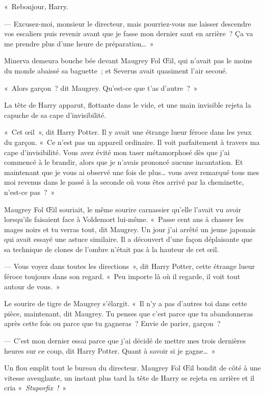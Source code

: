 \later

«~Rebonjour, Harry.

--- Excusez-moi, monsieur le directeur, mais pourriez-vous me laisser descendre vos escaliers puis revenir avant que je fasse mon dernier saut en arrière~? Ça va me prendre plus d'une heure de préparation…~»

\later

Minerva demeura bouche bée devant Maugrey Fol Œil, qui n'avait pas le moins du monde abaissé sa baguette~; et Severus avait quasiment l'air secoué.

«~Alors garçon~? dit Maugrey. Qu'est-ce que t'as d'autre~?~»

La tête de Harry apparut, flottante dans le vide, et une main invisible rejeta la capuche de sa cape d'invisibilité.

«~Cet œil~», dit Harry Potter. Il y avait une étrange lueur féroce dans les yeux du garçon. «~Ce n'est pas un appareil ordinaire. Il voit parfaitement à travers ma cape d'invisibilité. Vous avez évité mon taser métamorphosé dès que j'ai commencé à le brandir, alors que je n'avais prononcé aucune incantation. Et maintenant que je vous ai observé une fois de plus… vous avez remarqué tous mes moi revenus dans le passé à la seconde où vous êtes arrivé par la cheminette, n'est-ce pas~?~»

Maugrey Fol Œil souriait, le même sourire carnassier qu'elle l'avait vu avoir lorsqu'ils faisaient face à Voldemort lui-même. «~Passe cent ans à chasser les mages noirs et tu verras tout, dit Maugrey. Un jour j'ai arrêté un jeune japonais qui avait essayé une astuce similaire. Il a découvert d'une façon déplaisante que sa technique de clones de l'ombre n'était pas à la hauteur de cet œil.

--- Vous voyez dans toutes les directions~», dit Harry Potter, cette étrange lueur féroce toujours dans son regard. «~Peu importe là où il regarde, il voit tout autour de vous.~»

Le sourire de tigre de Maugrey s'élargit. «~Il n'y a pas d'autres toi dans cette pièce, maintenant, dit Maugrey. Tu penses que c'est parce que tu abandonneras après cette fois ou parce que tu gagneras~? Envie de parier, garçon~?

--- C'est mon dernier essai parce que j'ai décidé de mettre mes trois dernières heures sur ce coup, dit Harry Potter. Quant à savoir si je gagne…~»

Un flou emplit tout le bureau du directeur. Maugrey Fol Œil bondit de côté à une vitesse aveuglante, un instant plus tard la tête de Harry se rejeta en arrière et il cria «~\emph{Stuporfix~!}~»

